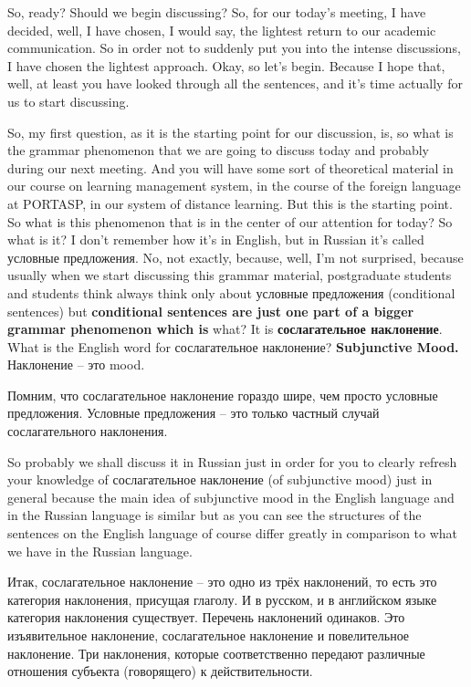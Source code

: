 \documentclass[main.tex]{subfiles}
\begin{document}
So, ready?
Should we begin discussing?
So, for our today's meeting, I have decided, well, I have chosen, I would say, the lightest return to our academic communication.
So in order not to suddenly put you into the intense discussions, I have chosen the lightest approach.
Okay, so let's begin.
Because I hope that, well, at least you have looked through all the sentences, and it's time actually for us to start discussing.

So, my first question, as it is the starting point for our discussion, is, so what is the grammar phenomenon that we are going to discuss today and probably during our next meeting.
And you will have some sort of theoretical material in our course on learning management system, in the course of the foreign language at PORTASP, in our system of distance learning.
But this is the starting point.
So what is this phenomenon that is in the center of our attention for today?
So what is it?
I don't remember how it's in English, but in Russian it's called условные предложения.
No, not exactly, because, well, I'm not surprised, because usually when we start discussing this grammar material, postgraduate students and students think always think only about условные предложения (conditional sentences) but \textbf{conditional sentences are just one part of a bigger grammar phenomenon which is} what?
It is \textbf{сослагательное наклонение}.
What is the English word for сослагательное наклонение?
\textbf{Subjunctive Mood.}
Наклонение -- это mood.

Помним, что сослагательное наклонение гораздо шире, чем просто условные предложения.
Условные предложения -- это только частный случай сослагательного наклонения.

So probably we shall discuss it in Russian just in order for you to clearly refresh your knowledge of сослагательное наклонение (of subjunctive mood) just in general because the main idea of subjunctive mood in the English language and in the Russian language is similar but as you can see the structures of the sentences on the English language of course differ greatly in comparison to what we have in the Russian language.

Итак, сослагательное наклонение -- это одно из трёх наклонений, то есть это категория наклонения, присущая глаголу.
И в русском, и в английском языке категория наклонения существует.
Перечень наклонений одинаков.
Это изъявительное наклонение, сослагательное наклонение и повелительное наклонение.
Три наклонения, которые соответственно передают различные отношения субъекта (говорящего) к действительности.
\end{document}
